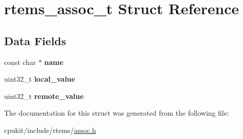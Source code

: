 \hypertarget{structrtems__assoc__t}{}\section{rtems\+\_\+assoc\+\_\+t Struct Reference}
\label{structrtems__assoc__t}
\subsection*{Data Fields}
\begin{DoxyCompactItemize}
\item 
\mbox{\label{structrtems__assoc__t_ad67e3fa3e5e65ce6443927ffb50b3e27}} 
const char $\ast$ {\bfseries name}
\item 
\mbox{\label{structrtems__assoc__t_ad6fe2f8c47feeee84b39dd6f23ae6de4}} 
uint32\+\_\+t {\bfseries local\+\_\+value}
\item 
\mbox{\label{structrtems__assoc__t_a7ae28b7fedfea30bd6e762814b0819e3}} 
uint32\+\_\+t {\bfseries remote\+\_\+value}
\end{DoxyCompactItemize}


The documentation for this struct was generated from the following file\+:\begin{DoxyCompactItemize}
\item 
cpukit/include/rtems/\mbox{\hyperlink{assoc_8h}{assoc.\+h}}\end{DoxyCompactItemize}
